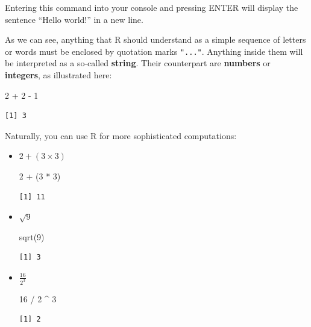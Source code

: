 \documentclass[
  11pt,
  letterpaper,
  DIV=11,
  numbers=noendperiod]{scrreprt}
\newenvironment{Shaded}{\begin{snugshade}}{\end{snugshade}}
\newcommand{\DecValTok}[1]{\textcolor[rgb]{0.68,0.00,0.00}{#1}}
\newcommand{\FunctionTok}[1]{\textcolor[rgb]{0.28,0.35,0.67}{#1}}
\newcommand{\NormalTok}[1]{\textcolor[rgb]{0.00,0.23,0.31}{#1}}
\newcommand{\SpecialCharTok}[1]{\textcolor[rgb]{0.37,0.37,0.37}{#1}}
\begin{document}
Entering this command into your console and pressing ENTER will display
the sentence ``Hello world!'' in a new line.

As we can see, anything that R should understand as a simple sequence of
letters or words must be enclosed by quotation marks \texttt{"..."}.
Anything inside them will be interpreted as a so-called \textbf{string}.
Their counterpart are \textbf{numbers} or \textbf{integers}, as
illustrated here:

\begin{Shaded}
\begin{Highlighting}[]
\DecValTok{2} \SpecialCharTok{+} \DecValTok{2} \SpecialCharTok{{-}} \DecValTok{1}
\end{Highlighting}
\end{Shaded}

\begin{verbatim}
[1] 3
\end{verbatim}

Naturally, you can use R for more sophisticated computations:

\begin{itemize}
\item
  \(2 + (3 \times 3)\)

\begin{Shaded}
\begin{Highlighting}[]
\DecValTok{2} \SpecialCharTok{+}\NormalTok{ (}\DecValTok{3} \SpecialCharTok{*} \DecValTok{3}\NormalTok{)}
\end{Highlighting}
\end{Shaded}

\begin{verbatim}
[1] 11
\end{verbatim}
\item
  \(\sqrt{9}\)

\begin{Shaded}
\begin{Highlighting}[]
\FunctionTok{sqrt}\NormalTok{(}\DecValTok{9}\NormalTok{)}
\end{Highlighting}
\end{Shaded}

\begin{verbatim}
[1] 3
\end{verbatim}
\item
  \(\frac{16}{2^3}\)

\begin{Shaded}
\begin{Highlighting}[]
\DecValTok{16} \SpecialCharTok{/} \DecValTok{2} \SpecialCharTok{\^{}} \DecValTok{3}
\end{Highlighting}
\end{Shaded}

\begin{verbatim}
[1] 2
\end{verbatim}
\end{itemize}
\end{document}
